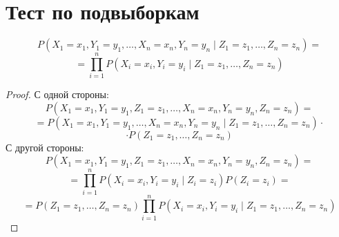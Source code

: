 \section{Тест по подвыборкам}

\begin{lemma}
    $$
    P(X_1=x_1,Y_1=y_1,\ldots,X_n=x_n,Y_n=y_n \mid Z_1=z_1,\ldots,Z_n=z_n)=
    $$
    $$
    =\prod_{i=1}^n P(X_i=x_i, Y_i=y_i \mid Z_1=z_1,\ldots,Z_n=z_n)
    $$
\end{lemma}
\begin{proof}
    С одной стороны:
    $$
    P(X_1=x_1,Y_1=y_1,Z_1=z_1,\ldots,X_n=x_n,Y_n=y_n,Z_n=z_n)=
    $$
    $$
    =P(X_1=x_1,Y_1=y_1,\ldots,X_n=x_n,Y_n=y_n \mid Z_1=z_1,\ldots,Z_n=z_n) \cdot
    $$
    $$
    \cdot P(Z_1=z_1,\ldots,Z_n=z_n)
    $$
    С другой стороны:
    $$
    P(X_1=x_1,Y_1=y_1,Z_1=z_1,\ldots,X_n=x_n,Y_n=y_n,Z_n=z_n)=
    $$
    $$
    =\prod_{i=1}^n P(X_i=x_i, Y_i=y_i \mid Z_i=z_i)P(Z_i=z_i)=
    $$
    $$
    =P(Z_1=z_1,\ldots,Z_n=z_n)\prod_{i=1}^n P(X_i=x_i, Y_i=y_i \mid Z_1=z_1,\ldots,Z_n=z_n)
    $$

\end{proof}
